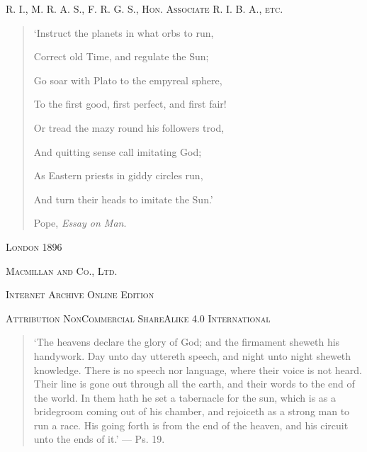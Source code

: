 \documentclass[a4paper, 11pt, oneside, polutonikogreek, english]{article}
\begin{document}
\begin{titlepage}
	\vspace*{1\baselineskip} %
	
    {\scshape\scriptsize R. I., M. R. A. S., F. R. G. S., Hon. Associate R. I. B. A., etc.} %
  
    \vspace{3\baselineskip}
    
        \begin{quotation}\small
`Instruct the planets in what orbs to run,

Correct old Time, and regulate the Sun;

Go soar with Plato to the empyreal sphere,

To the first good, first perfect, and first fair!

Or tread the mazy round his followers trod,

And quitting sense call imitating God;

As Eastern priests in giddy circles run,

And turn their heads to imitate the Sun.'

\begin{center}Pope, \emph{Essay on Man}.\end{center}
        \end{quotation}

  
    \vspace*{\fill}

	\vspace{1\baselineskip}

	{\small\scshape London 1896}
	
	{\small\scshape{Macmillan and Co., Ltd.}}
	
	\vspace{0.5\baselineskip} %

    \scshape Internet Archive Online Edition  %
	
	{\scshape\small Attribution NonCommercial ShareAlike 4.0 International } %
\end{titlepage}
\setlength{\parskip}{1mm plus1mm minus1mm}
\clearpage
\tableofcontents
\clearpage
\listoffigures
\clearpage
\begin{quotation}\small
`The heavens declare the glory of God; and the firmament sheweth his handywork. Day unto day uttereth speech, and night unto night sheweth knowledge. There is no speech nor language, where their voice is not heard. Their line is gone out through all the earth, and their words to the end of the world. In them hath he set a tabernacle for the sun, which is as a bridegroom coming out of his chamber, and rejoiceth as a strong man to run a race. His going forth is from the end of the heaven, and his circuit unto the ends of it.' --- Ps. 19.
\end{quotation}
\end{document}
